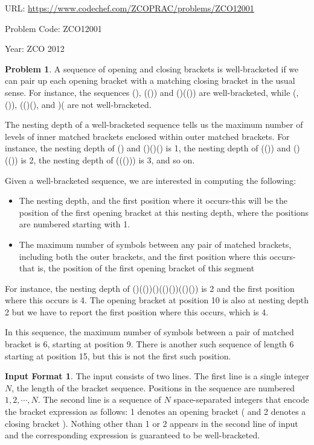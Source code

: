 \documentclass[twoside,12pt,a4paper,english]{book}
\theoremstyle{definition}
\theoremstyle{problemstyle}
\newtheorem*{problem}{Problem} %
\theoremstyle{problemstyle}
\newtheorem*{input_st}{Input Format} %
\theoremstyle{problemstyle}
\begin{document}
URL: \url{https://www.codechef.com/ZCOPRAC/problems/ZCO12001}

Problem Code: ZCO12001

Year: ZCO 2012

\begin{problem}

A sequence of opening and closing brackets is well-bracketed if we can pair up each opening bracket with a matching closing bracket in the usual sense. For instance, the sequences (), (()) and ()(()) are well-bracketed, while (, ()), (()(), and )( are not well-bracketed.

The nesting depth of a well-bracketed sequence tells us the maximum number of levels of inner matched brackets enclosed within outer matched brackets. For instance, the nesting depth of () and ()()() is 1, the nesting depth of (()) and ()(()) is 2, the nesting depth of ((())) is 3, and so on.

Given a well-bracketed sequence, we are interested in computing the following:

\begin{itemize}
    \item The nesting depth, and the first position where it occurs-this will be the position of the first opening bracket at this nesting depth, where the positions are numbered starting with 1.
    \item The maximum number of symbols between any pair of matched brackets, including both the outer brackets, and the first position where this occurs-that is, the position of the first opening bracket of this segment
\end{itemize}

For instance, the nesting depth of ()(())()(()())(()()) is 2 and the first position where this occurs is 4. The opening bracket at position 10 is also at nesting depth 2 but we have to report the first position where this occurs, which is 4.

In this sequence, the maximum number of symbols between a pair of matched bracket is 6, starting at position 9. There is another such sequence of length 6 starting at position 15, but this is not the first such position.
\end{problem}


\begin{input_st}

The input consists of two lines. The first line is a single integer $N$, the length of the bracket sequence. Positions in the sequence are numbered $1,2,\cdots,N$. The second line is a sequence of $N$ space-separated integers that encode the bracket expression as follows: 1 denotes an opening bracket ( and 2 denotes a closing bracket ). Nothing other than 1 or 2 appears in the second line of input and the corresponding expression is guaranteed to be well-bracketed.


\end{input_st}
\end{document}
